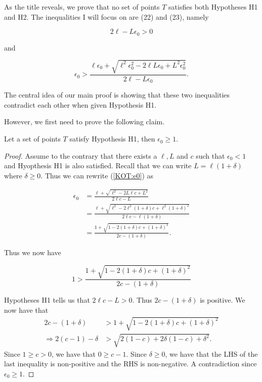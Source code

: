 \documentclass[review]{elsarticle}
\begin{document}
As the title reveals, we prove that no set of points $T$ satisfies both Hypotheses H1 and H2. The inequalities I will focus on are (22) and (23), namely 

\begin{equation}\label{KOT:22}
    2\ell -L\epsilon_0>0\tag{22}
\end{equation}

and 

\begin{equation}\label{KOT:23}
    \epsilon_0>\frac{\ell \epsilon_0 +\sqrt{\ell^2\epsilon_0^2-2\ell L \epsilon_0 + L^2 \epsilon_0^2}}{2\ell -L\epsilon_0}.\tag{23}
\end{equation}


The central idea of our main proof is showing that these two inequalities contradict each other when given Hypothesis H1.

However, we first need to prove the following claim.

\begin{claim}
Let a set of points $T$ satisfy Hypothesis H1, then $\epsilon_0\ge1.$
\end{claim}

\begin{proof}
Assume to the contrary that there exists a $\ell,L$ and $c$ such that $\epsilon_0<1$ and Hyopthesis H1 is also satisfied. Recall that we can write $L=\ell(1+\delta)$ where $\delta\ge0$. Thus we can rewrite (\ref{KOT:e0}) as

\begin{align*}
    \epsilon_0 &= \frac{\ell+\sqrt{\ell^2 -2L\ell c+L^2}}{2\ell c-L}\\
    &=\frac{\ell+\sqrt{\ell^2 -2\ell^2(1+\delta) c+\ell^2(1+\delta)^2}}{2\ell c-\ell (1+\delta)}\\
    &=\frac{1+\sqrt{1 -2(1+\delta) c+(1+\delta)^2}}{2 c- (1+\delta)}.
\end{align*}

Thus we now have 

\begin{equation*}
    1>\frac{1+\sqrt{1 -2(1+\delta) c+(1+\delta)^2}}{2 c- (1+\delta)}
\end{equation*}

 Hypotheses H1 tells us that $2\ell c -L>0$. Thus $2 c- (1+\delta)$ is positive. We now have that
\begin{align*}
    2 c- (1+\delta) &> 1+\sqrt{1 -2(1+\delta) c+(1+\delta)^2} \\
    \Rightarrow 2(c-1) -\delta &>\sqrt{2(1-c)+2\delta(1-c)+\delta^2}.
\end{align*}
Since $1\ge c>0$, we have that $0\ge c-1.$ Since $\delta\ge 0$, we have that the LHS of the last inequality is non-positive and the RHS is non-negative. A contradiction since $\epsilon_0\ge 1.$
\end{proof}
\end{document}
